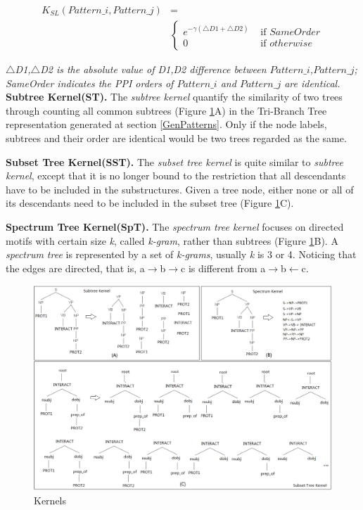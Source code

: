 \begin{equation}
\begin{aligned}
K_{SL}(Pattern\_i,Pattern\_j) &= \\
&\begin{cases}
 e^{-\gamma (\triangle D1 + \triangle D2)} & \text{ if } SameOrder \\
 0 & \text{ if } otherwise
\end{cases}
\end{aligned}
\end{equation}

\emph{$\triangle$D1,$\triangle$D2 is the absolute value of D1,D2 difference between $Pattern\_i$,$Pattern\_j$; SameOrder indicates the PPI orders of $Pattern\_i$ and $Pattern\_j$ are identical.} \\

\textbf{Subtree Kernel(ST).} The \emph{subtree kernel} quantify the similarity of two trees through counting all common subtrees\cite{DBLP:conf/nips/ViswanathanS02} (Figure \ref{fig:convKernel}A) in the Tri-Branch Tree representation generated at section \ref{GenPatterns}. Only if the node labels, subtrees and their order are identical would be two trees regarded as the same.

\textbf{Subset Tree Kernel(SST).} The \emph{subset tree kernel} is quite similar to \emph{subtree kernel}, except that it is no longer bound to the restriction that all descendants have to be included in the substructures\cite{DBLP:conf/nips/CollinsD01}. Given a tree node, either none or all of its descendants need to be included in the subset tree (Figure \ref{fig:convKernel}C).

\textbf{Spectrum Tree Kernel(SpT)\cite{Kuboyama07}.} The \emph{spectrum tree kernel} focuses on directed motifs with certain size \emph{k}, called \emph{k-gram}, rather than subtrees\cite{DBLP:conf/nips/CollinsD01} (Figure \ref{fig:convKernel}B). A \emph{spectrum tree} is represented by a set of \emph{k-grams}, usually \emph{k} is 3 or 4. Noticing that the edges are directed, that is, a$\longrightarrow$b$\longrightarrow$c is different from a$\longrightarrow$b$\longleftarrow$c. \\

\begin{figure}[htb]
\centering
\includegraphics[width=1.0\textwidth]{fig/figure7.png}
\caption{Kernels}
\label{fig:convKernel}
\end{figure}


